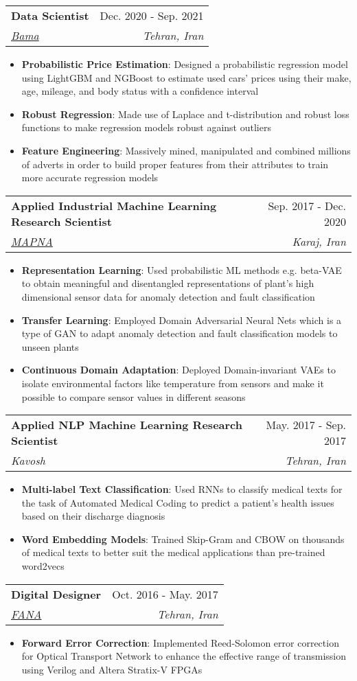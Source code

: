 \documentclass[letterpaper,11pt]{article}
\makeatletter
\newcommand{\resumeItem}[2]{
  \item\small{
    \textbf{#1}{: #2 \vspace{-2pt}}
  }
}
\newcommand{\resumeSubheading}[4]{
  \vspace{-1pt}\item
    \begin{tabular*}{0.97\textwidth}[t]{l@{\extracolsep{\fill}}r}
      \textbf{#1} & #2 \\
      \textit{\small#3} & \textit{\small #4} \\
    \end{tabular*}\vspace{-5pt}
}
\newcommand{\resumeItemListStart}{\begin{itemize}}
\newcommand{\resumeItemListEnd}{\end{itemize}\vspace{-5pt}}
\makeatother
\begin{document}
    \resumeSubheading
      {Data Scientist}{Dec. 2020 - Sep. 2021}
      {\href{https://bama.ir}{Bama}}{Tehran, Iran}
      \resumeItemListStart
        \resumeItem{Probabilistic Price Estimation}
          {Designed a probabilistic regression model using LightGBM and NGBoost to estimate used cars' prices using their make, age, mileage, and body status with a confidence interval}
        \resumeItem{Robust Regression}
          {Made use of Laplace and t-distribution and robust loss functions to make regression models robust against outliers}
        \resumeItem{Feature Engineering}
          {Massively mined, manipulated and combined millions of adverts in order to build proper features from their attributes to train more accurate regression models}
      \resumeItemListEnd

    \resumeSubheading
      {Applied Industrial Machine Learning Research Scientist}{Sep. 2017 - Dec. 2020}
      {\href{https://mapnagroup.com/?lang=en}{MAPNA}}{Karaj, Iran}
        \resumeItemListStart
          \resumeItem{Representation Learning}
          {Used probabilistic ML methods e.g. beta-VAE to obtain meaningful and disentangled representations of plant's high dimensional sensor data for anomaly detection and fault classification}
          \resumeItem{Transfer Learning}
          {Employed Domain Adversarial Neural Nets which is a type of GAN to adapt anomaly detection and fault classification models to unseen plants}
          \resumeItem{Continuous Domain Adaptation}
          {Deployed Domain-invariant VAEs to isolate environmental factors like temperature from sensors and make it possible to compare sensor values in different seasons}                 
        \resumeItemListEnd

    \resumeSubheading
      {Applied NLP Machine Learning Research Scientist}{May. 2017 - Sep. 2017}
      {Kavosh}{Tehran, Iran}
      \resumeItemListStart
        \resumeItem{Multi-label Text Classification}
          {Used RNNs to classify medical texts for the task of Automated Medical Coding to predict a patient's health issues based on their discharge diagnosis}
        \resumeItem{Word Embedding Models}
          {Trained Skip-Gram and CBOW on thousands of medical texts to better suit the medical applications than pre-trained word2vecs}
      \resumeItemListEnd

    \resumeSubheading
      {Digital Designer}{Oct. 2016 - May. 2017}
      {\href{http://www.fananet.com/indexEn.html}{FANA}}{Tehran, Iran}
      \resumeItemListStart
        \resumeItem{Forward Error Correction}
          {Implemented Reed-Solomon error correction for Optical Transport Network to enhance the effective range of transmission using Verilog and Altera Stratix-V FPGAs}
      \resumeItemListEnd
\end{document}
